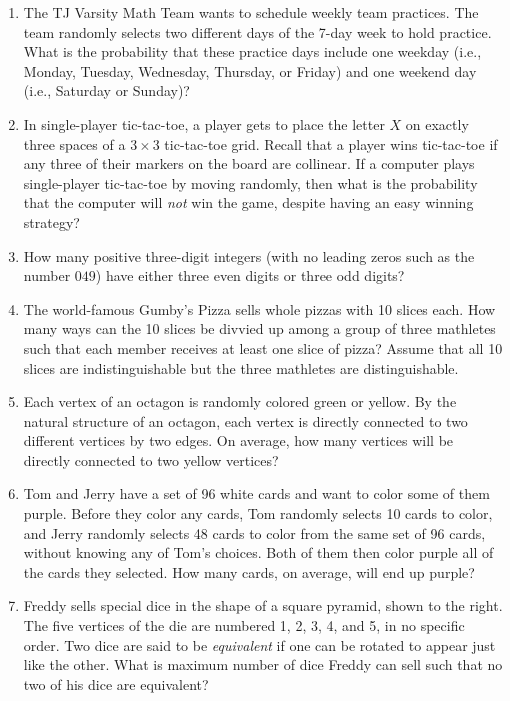 \documentclass[11pt]{article}
\begin{document}
\begin{enumerate}[1.]
			\item The TJ Varsity Math Team wants to schedule weekly team practices. The team randomly selects two different days of the 7-day week to hold practice. What is the probability that these practice days include one weekday (i.e., Monday, Tuesday, Wednesday, Thursday, or Friday) and one weekend day (i.e., Saturday or Sunday)?
			
			\item In single-player tic-tac-toe, a player gets to place the letter $X$ on exactly three spaces of a $3 \times 3$ tic-tac-toe grid. Recall that a player wins tic-tac-toe if any three of their markers on the board are collinear. If a computer plays single-player tic-tac-toe by moving randomly, then what is the probability that the computer will \textit{not} win the game, despite having an easy winning strategy?
			
			\item How many positive three-digit integers (with no leading zeros such as the number $049$) have either three even digits or three odd digits?
			
			\item The world-famous Gumby's Pizza sells whole pizzas with 10 slices each. How many ways can the 10 slices be divvied up among a group of three mathletes such that each member receives at least one slice of pizza? Assume that all 10 slices are indistinguishable but the three mathletes are distinguishable.
			
			\item Each vertex of an octagon is randomly colored green or yellow. By the natural structure of an octagon, each vertex is directly connected to two different vertices by two edges. On average, how many vertices will be directly connected to two yellow vertices?
      
			\item Tom and Jerry have a set of 96 white cards and want to color some of them purple. Before they color any cards, Tom randomly selects 10 cards to color, and Jerry randomly selects 48 cards to color from the same set of 96 cards, without knowing any of Tom's choices. Both of them then color purple all of the cards they selected. How many cards, on average, will end up purple?
			
			\item Freddy sells special dice in the shape of a square pyramid, shown to the right. The five vertices of the die are numbered 1, 2, 3, 4, and 5, in no specific order. Two dice are said to be \textit{equivalent} if one can be rotated to appear just like the other. What is maximum number of dice Freddy can sell such that no two of his dice are equivalent?
			

\end{enumerate}
\end{document}
